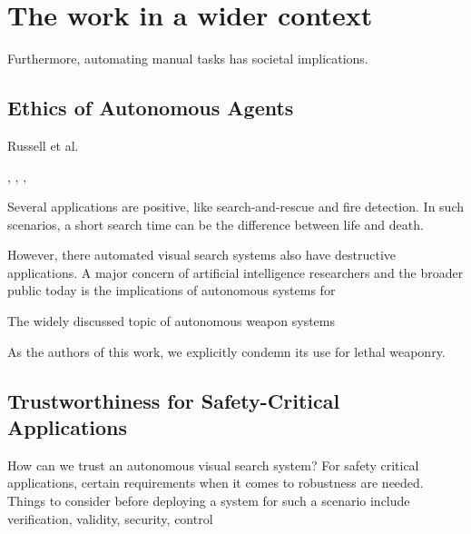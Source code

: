 \section{The work in a wider context}
\label{sec:discussion-wider}

% 

Furthermore, automating manual tasks has societal implications.


\subsection{Ethics of Autonomous Agents}

Russell et al.~\cite{russell_priorities_2015}

\cite{vinuesa_sustainable_2020}, \cite{russell_ethics_2015}, \cite{russell_beneficial_2022}, \cite{brundage_malicious_2018}

Several applications are positive, like search-and-rescue and fire detection.
In such scenarios, a short search time can be the difference between life and death.


However, there automated visual search systems also have destructive applications.
A major concern of artificial intelligence researchers and the broader public today is the implications of autonomous systems for 

The widely discussed topic of autonomous weapon systems


As the authors of this work, we explicitly condemn its use for lethal weaponry.

\subsection{Trustworthiness for Safety-Critical Applications}

How can we trust an autonomous visual search system?
For safety critical applications, certain requirements when it comes to robustness are needed.
Things to consider before deploying a system for such a scenario include verification, validity, security, control

